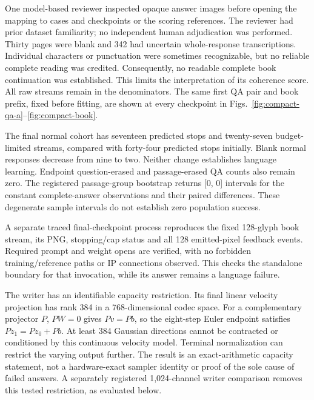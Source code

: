 One model-based reviewer inspected opaque answer images before opening the
mapping to cases and checkpoints or the scoring references. The reviewer had prior dataset
familiarity; no independent human adjudication was performed. Thirty pages
were blank and 342 had uncertain whole-response transcriptions. Individual
characters or punctuation were sometimes recognizable, but no reliable
complete reading was credited. Consequently, no readable complete book
continuation was established. This limits the interpretation of its coherence
score. All raw streams remain in the denominators. The same first QA pair and
book prefix, fixed before fitting, are shown at every checkpoint in
Figs.~\ref{fig:compact-qa-a}--\ref{fig:compact-book}.

The final normal cohort has seventeen predicted stops and twenty-seven
budget-limited streams, compared with forty-four predicted stops initially.
Blank normal responses decrease from nine to two. Neither change establishes
language learning. Endpoint question-erased and passage-erased QA counts also
remain zero. The registered passage-group bootstrap returns [0, 0] intervals
for the constant complete-answer observations and their paired differences.
These degenerate sample intervals do not establish zero population success.

A separate traced final-checkpoint process reproduces the fixed 128-glyph
book stream, its PNG, stopping/cap status and all 128 emitted-pixel feedback
events. Required prompt and weight opens are verified, with no forbidden
training/reference paths or IP connections observed. This checks the standalone
boundary for that invocation, while its answer remains a language failure.

The writer has an identifiable capacity restriction. Its final linear
velocity projection has rank 384 in a 768-dimensional codec space. For a
complementary projector $P$, $PW=0$ gives $Pv=Pb$, so the eight-step Euler
endpoint satisfies $Pz_1=Pz_0+Pb$. At least 384 Gaussian directions cannot be
contracted or conditioned by this continuous velocity model. Terminal
normalization can restrict the varying output further. The result is an
exact-arithmetic capacity statement, not a hardware-exact sampler identity or
proof of the sole cause of failed answers. A separately registered 1,024-channel
writer comparison removes this tested restriction, as evaluated below.


